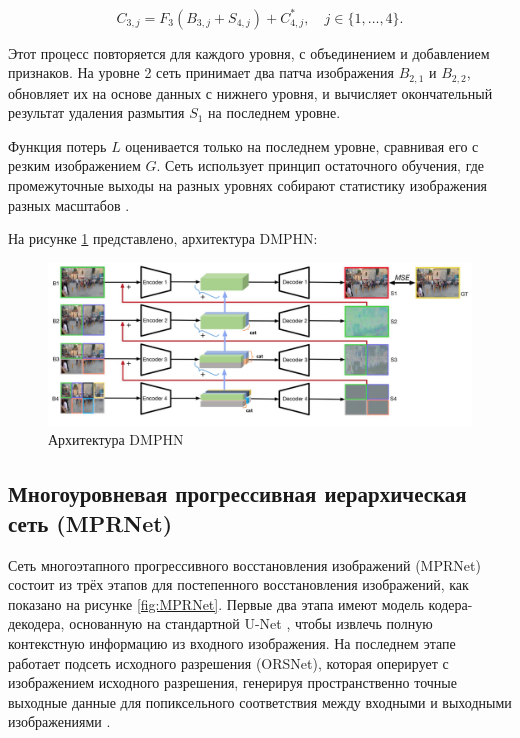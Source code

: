 \begin{equation}
	C_{3,j} = F_{3}(B_{3,j} + S_{4,j}) + C_{4,j}^{\ast}, \quad j \in \{1, \dots, 4\}.
\end{equation}

Этот процесс повторяется для каждого уровня, с объединением и добавлением признаков. На уровне 2 сеть принимает два патча изображения \(B_{2,1}\) и \(B_{2,2}\), обновляет их на основе данных с нижнего уровня, и вычисляет окончательный результат удаления размытия \(S_{1}\) на последнем уровне.

Функция потерь \(L\) оценивается только на последнем уровне, сравнивая его с резким изображением \(G\). Сеть использует принцип остаточного обучения, где промежуточные выходы на разных уровнях собирают статистику изображения разных масштабов \cite{zhang2019deep}.

На рисунке \ref{fig:dmphn} представлено, архитектура DMPHN:
\begin{figure}[H]
	\centering
	\includegraphics[width=0.8\linewidth]{assets/DMPHN.png}
	\caption{Архитектура DMPHN}
	\label{fig:dmphn}
\end{figure}


\subsection{Многоуровневая прогрессивная иерархическая сеть (MPRNet)}

Сеть многоэтапного прогрессивного восстановления изображений (MPRNet) состоит из трёх этапов для постепенного восстановления изображений, как показано на рисунке \ref{fig:MPRNet}. Первые два этапа имеют модель кодера-декодера, основанную на стандартной U-Net \cite{unet2015}, чтобы извлечь полную контекстную информацию из входного изображения. На последнем этапе работает подсеть исходного разрешения (ORSNet), которая оперирует с изображением исходного разрешения, генерируя пространственно точные выходные данные для попиксельного соответствия между входными и выходными \\ изображениями \cite{zamir2021multi}.

